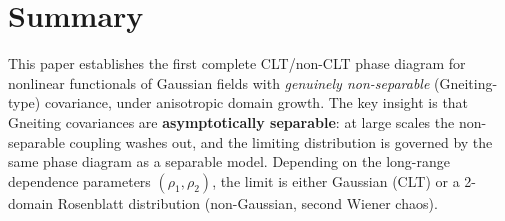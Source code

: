 \documentclass[11pt,a4paper]{article}
\begin{document}
\section*{Summary}

This paper establishes the first complete CLT/non-CLT phase diagram for nonlinear functionals of Gaussian fields with \emph{genuinely non-separable} (Gneiting-type) covariance, under anisotropic domain growth.
The key insight is that Gneiting covariances are \textbf{asymptotically separable}: at large scales the non-separable coupling washes out, and the limiting distribution is governed by the same phase diagram as a separable model.
Depending on the long-range dependence parameters $(\rho_1, \rho_2)$, the limit is either Gaussian (CLT) or a 2-domain Rosenblatt distribution (non-Gaussian, second Wiener chaos).
\end{document}
